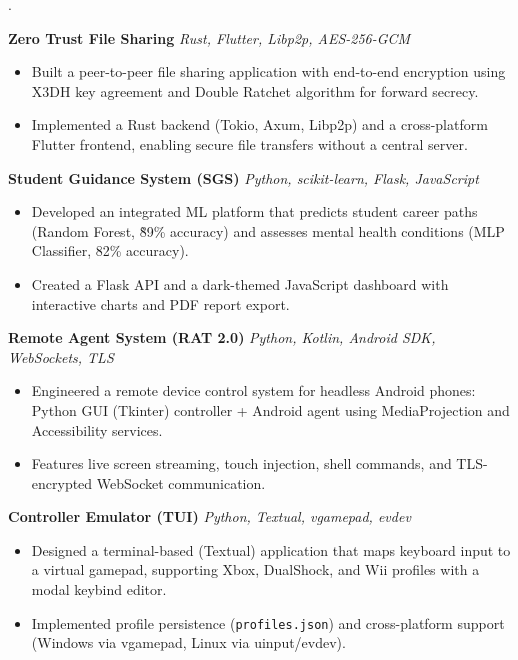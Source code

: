 .\documentclass[11pt]{article}
\begin{document}
\textbf{Zero Trust File Sharing} \hfill \textit{Rust, Flutter, Libp2p, AES-256-GCM} \\
\begin{itemize}[leftmargin=*, nosep]
  \item Built a peer-to-peer file sharing application with end-to-end encryption using X3DH key agreement and Double Ratchet algorithm for forward secrecy.
  \item Implemented a Rust backend (Tokio, Axum, Libp2p) and a cross-platform Flutter frontend, enabling secure file transfers without a central server.
\end{itemize}

\textbf{Student Guidance System (SGS)} \hfill \textit{Python, scikit-learn, Flask, JavaScript} \\
\begin{itemize}[leftmargin=*, nosep]
  \item Developed an integrated ML platform that predicts student career paths (Random Forest, \~89\% accuracy) and assesses mental health conditions (MLP Classifier, 82\% accuracy).
  \item Created a Flask API and a dark-themed JavaScript dashboard with interactive charts and PDF report export.
\end{itemize}

\textbf{Remote Agent System (RAT 2.0)} \hfill \textit{Python, Kotlin, Android SDK, WebSockets, TLS} \\
\begin{itemize}[leftmargin=*, nosep]
  \item Engineered a remote device control system for headless Android phones: Python GUI (Tkinter) controller + Android agent using MediaProjection and Accessibility services.
  \item Features live screen streaming, touch injection, shell commands, and TLS-encrypted WebSocket communication.
\end{itemize}

\textbf{Controller Emulator (TUI)} \hfill \textit{Python, Textual, vgamepad, evdev} \\
\begin{itemize}[leftmargin=*, nosep]
  \item Designed a terminal-based (Textual) application that maps keyboard input to a virtual gamepad, supporting Xbox, DualShock, and Wii profiles with a modal keybind editor.
  \item Implemented profile persistence (\texttt{profiles.json}) and cross-platform support (Windows via vgamepad, Linux via uinput/evdev).
\end{itemize}
\end{document}
